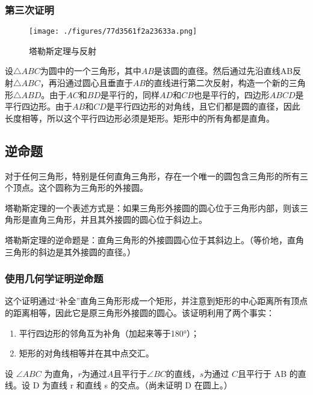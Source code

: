 \subsubsection{第三次证明}
\begin{figure}[ht]
\centering
\texttt{[image: ./figures/77d3561f2a23633a.png]}
\caption{塔勒斯定理与反射} \label{fig_Thales_5}
\end{figure}
设\(\triangle ABC\)为圆中的一个三角形，其中\(AB\)是该圆的直径。然后通过先沿直线AB反射\(\triangle ABC\)，再沿通过圆心且垂直于\(AB\)的直线进行第二次反射，构造一个新的三角形\(\triangle ABD\)。由于\(AC\)和\(BD\)是平行的，同样\(AD\)和\(CB\)也是平行的，四边形\(ABCD\)是平行四边形。由于\(AB\)和\(CD\)是平行四边形的对角线，且它们都是圆的直径，因此长度相等，所以这个平行四边形必须是矩形。矩形中的所有角都是直角。
\subsection{逆命题}  
对于任何三角形，特别是任何直角三角形，存在一个唯一的圆包含三角形的所有三个顶点。这个圆称为三角形的外接圆。

塔勒斯定理的一个表述方式是：如果三角形外接圆的圆心位于三角形内部，则该三角形是直角三角形，并且其外接圆的圆心位于斜边上。

塔勒斯定理的逆命题是：直角三角形的外接圆圆心位于其斜边上。（等价地，直角三角形的斜边是其外接圆的直径。）
\subsubsection{使用几何学证明逆命题}

这个证明通过“补全”直角三角形形成一个矩形，并注意到矩形的中心距离所有顶点的距离相等，因此它是原三角形外接圆的圆心。该证明利用了两个事实：
\begin{enumerate}
\item 平行四边形的邻角互为补角（加起来等于180°）；
\item 矩形的对角线相等并在其中点交汇。
\end{enumerate}
设 \(\angle ABC\) 为直角，\(r\)为通过\(A\)且平行于\(\angle BC\)的直线，\(s\)为通过 \(C\)且平行于 AB 的直线。设 D 为直线 r 和直线 s 的交点。（尚未证明 D 在圆上。）